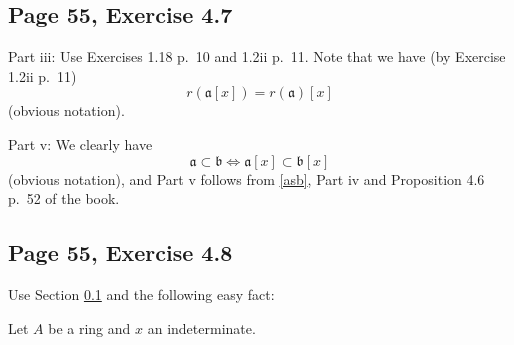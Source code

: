 \documentclass[parskip=half,fontsize=12pt]{scrartcl}%
\newcommand{\mf}{\mathfrak}
\newcommand{\aaa}{\mf a}
\newcommand{\bbb}{\mf b}
\begin{document}
\subsection{Page 55, Exercise 4.7}\label{5547}%

Part iii: Use Exercises 1.18 p.~10 and 1.2ii p.~11. Note that we have (by Exercise 1.2ii p.~11)
\begin{equation}\label{rax}
r(\aaa[x])=r(\aaa)[x]
\end{equation}
(obvious notation).

\begin{comment}
Part iv: We claim: %
\begin{equation}\label{acbx}
(\aaa\cap\bbb)[x]=\aaa[x]\cap\bbb[x]
\end{equation}
(obvious notation).

Proof: The diagram 
$$
\begin{tikzcd}
0\ar[r]&(\aaa\cap\bbb)[x]\ar[d]\ar[r]&(\aaa\oplus\bbb)[x]\ar[d]\ar[r]&(\aaa+\bbb)[x]\ar[d]\ar[r]&0\\ 
0\ar[r]&\aaa[x]\cap\bbb[x]\ar[r]&\aaa[x]\oplus\bbb[x]\ar[r]&\aaa[x]+\bbb[x]\ar[r]&0
\end{tikzcd}
$$ 
(where the arrows are the obvious ones) commutes, the rows are exact, the second vertical arrow is clearly an isomorphism, and the third vertical arrow is an isomorphism by Exercises 1.18 p.~10. Thus the first vertical arrow is also an isomorphism. But by its (implicit) definition this arrow is an inclusion. Being surjective, it is actually an equality. $\square$

Then Part iv follows from \eqref{acbx} and Part iii.
\end{comment}

Part v: We clearly have 
\begin{equation}\label{asb}
\aaa\subset\bbb\iff\aaa[x]\subset\bbb[x]
\end{equation}
(obvious notation), and Part v follows from \eqref{asb}, Part iv and Proposition 4.6 p.~52 of the book.

\subsection{Page 55, Exercise 4.8}%

Use Section \ref{5547} and the following easy fact:

Let $A$ be a ring and $x$ an indeterminate.

\end{document}
